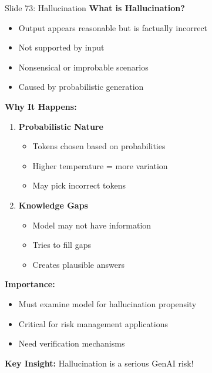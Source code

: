\documentclass[8pt]{beamer}
\begin{document}
	\begin{frame}{Slide 73: Hallucination}
		\fontsize{6.5}{7.5}\selectfont
		\textbf{What is Hallucination?}
		\begin{itemize}
			\item Output appears reasonable but is factually incorrect
			\item Not supported by input
			\item Nonsensical or improbable scenarios
			\item Caused by probabilistic generation
		\end{itemize}
		
		\vspace{0.1cm}
		\textbf{Why It Happens:}
		\begin{enumerate}
			\item \textbf{Probabilistic Nature}
			\begin{itemize}
				\item Tokens chosen based on probabilities
				\item Higher temperature = more variation
				\item May pick incorrect tokens
			\end{itemize}
			\item \textbf{Knowledge Gaps}
			\begin{itemize}
				\item Model may not have information
				\item Tries to fill gaps
				\item Creates plausible answers
			\end{itemize}
		\end{enumerate}
		
		\vspace{0.1cm}
		\textbf{Importance:}
		\begin{itemize}
			\item Must examine model for hallucination propensity
			\item Critical for risk management applications
			\item Need verification mechanisms
		\end{itemize}
		
		\textcolor{myblue}{\textbf{Key Insight:}} Hallucination is a serious GenAI risk!
	\end{frame}
	
\end{document}
